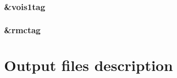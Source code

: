 \documentclass[a4paper]{article}
\begin{document}
\subsubsection{\&vois1tag }
\subsubsection{\&rmctag }

\section{Output files description}



\end{document}
